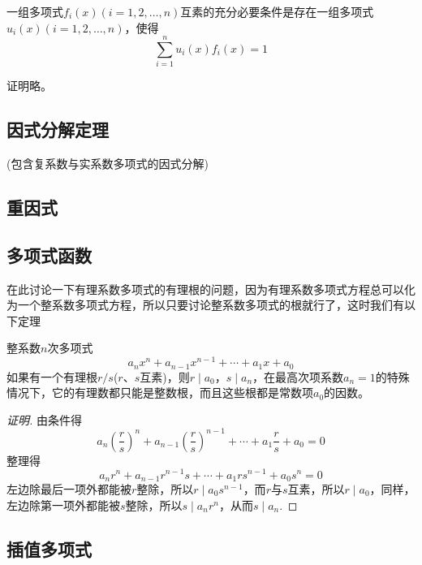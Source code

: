 \begin{theorem}
  一组多项式$f_i(x)(i=1,2,\ldots,n)$互素的充分必要条件是存在一组多项式$u_i(x)(i=1,2,\ldots,n)$，使得
  \[ \sum_{i=1}^n u_i(x)f_i(x) = 1 \]
\end{theorem}
证明略。

\subsection{因式分解定理}
\label{sec:factoring-theorem}

(包含复系数与实系数多项式的因式分解)

\subsection{重因式}
\label{sec:mulitple-factor}

\subsection{多项式函数}
\label{sec:polynome-function}

在此讨论一下有理系数多项式的有理根的问题，因为有理系数多项式方程总可以化为一个整系数多项式方程，所以只要讨论整系数多项式的根就行了，这时我们有以下定理
\begin{theorem}
  整系数$n$次多项式
  \[ a_nx^n+a_{n-1}x^{n-1}+\cdots+a_1x+a_0 \]
  如果有一个有理根$r/s$($r$、$s$互素)，则$r \mid a_0$，$s \mid a_n$，在最高次项系数$a_n=1$的特殊情况下，它的有理数都只能是整数根，而且这些根都是常数项$a_0$的因数。
\end{theorem}

\begin{proof}[证明]
  由条件得
  \[ a_n \left( \frac{r}{s} \right)^{n} + a_{n-1}\left( \frac{r}{s} \right)^{n-1} + \cdots + a_1 \frac{r}{s} + a_0 = 0 \]
  整理得
  \[ a_nr^n + a_{n-1}r^{n-1}s + \cdots + a_1rs^{n-1} + a_0s^n = 0 \]
  左边除最后一项外都能被$r$整除，所以$r \mid a_0s^{n-1}$，而$r$与$s$互素，所以$r \mid a_0$，同样，左边除第一项外都能被$s$整除，所以$s \mid a_nr^n$，从而$s \mid a_n$.
\end{proof}

\subsection{插值多项式}
\label{sec:interpolation-polynome}






